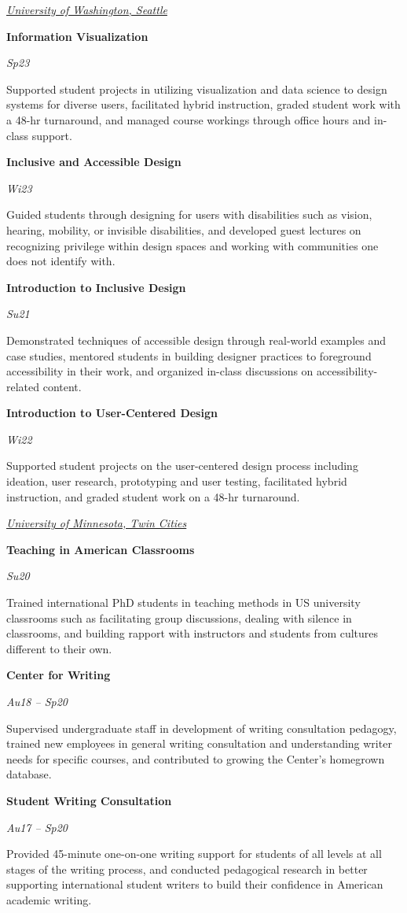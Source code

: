 \documentclass[10pt, letterpaper]{article}
\newcommand{\uwexpentry}[3]{%
  \noindent
  \begin{minipage}[t]{0.80\linewidth}
    \textbf{#1}
  \end{minipage}%
  \hfill
  \begin{minipage}[t]{0.18\linewidth}\raggedleft
    \textcolor{uwpurple}{\textit{#2}}
  \end{minipage}\par\vspace{2pt}
  \noindent
  \begin{minipage}[t]{0.85\linewidth} #3 \end{minipage}\par
  \vspace{5pt}
}
\newcommand{\umnexpentry}[3]{%
  \noindent
  \begin{minipage}[t]{0.80\linewidth}
    \textbf{#1}
  \end{minipage}%
  \hfill
  \begin{minipage}[t]{0.18\linewidth}\raggedleft
    \textcolor{umnmaroon}{\textit{#2}}
  \end{minipage}\par\vspace{2pt}
  \noindent
  \begin{minipage}[t]{0.85\linewidth} #3 \end{minipage}\par
  \vspace{5pt}
}
\begin{document}
\noindent{}\vspace{3pt}

\noindent\underline{\large \textcolor{uwpurple}{\textit{University of Washington, Seattle}}}\vspace{3pt}

\uwexpentry{Information Visualization}{Sp23}
  {Supported student projects in utilizing visualization and data science to design systems for diverse users, facilitated hybrid instruction, graded student work with a 48-hr turnaround, and managed course workings through office hours and in-class support. 
}

\uwexpentry{Inclusive and Accessible Design}{Wi23}
  {Guided students through designing for users with disabilities such as vision, hearing, mobility, or invisible disabilities, and developed guest lectures on recognizing privilege within design spaces and working with communities one does not identify with. 
}
\newpage
\uwexpentry{Introduction to Inclusive Design}{Su21}
  {Demonstrated techniques of accessible design through real-world examples and case studies, mentored students in building designer practices to foreground accessibility in their work, and organized in-class discussions on accessibility-related content. 
}

\uwexpentry{Introduction to User-Centered Design}{Wi22}
  {Supported student projects on the user-centered design process including ideation, user research, prototyping and user testing, facilitated hybrid instruction, and graded student work on a 48-hr turnaround.}

\noindent\underline{\large \textcolor{umnmaroon}{\textit{University of Minnesota, Twin Cities}}}\vspace{3pt}

\umnexpentry{Teaching in American Classrooms}{Su20}
  {Trained international PhD students in teaching methods in US university classrooms such as facilitating group discussions, dealing with silence in classrooms, and building rapport with instructors and students from cultures different to their own.}

\umnexpentry{Center for Writing}{Au18 -- Sp20}
  {Supervised undergraduate staff in development of writing consultation pedagogy, trained new employees in general writing consultation and understanding writer needs for specific courses, and contributed to growing the Center's homegrown database.}

\umnexpentry{Student Writing Consultation}{Au17 -- Sp20}
  {Provided 45-minute one-on-one writing support for students of all levels at all stages of the writing process, and conducted pedagogical research in better supporting international student writers to build their confidence in American academic writing.}
\end{document}
